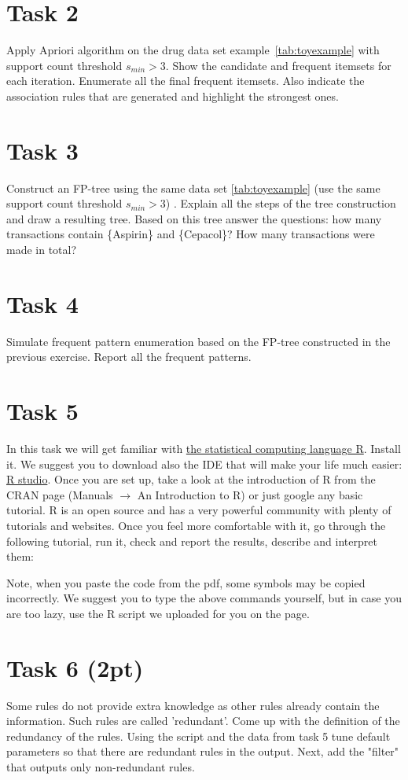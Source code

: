\documentclass{article}
\begin{document}
\section*{Task 2}
Apply Apriori algorithm on the drug data set example~\ref{tab:toyexample} with support count threshold $s_{min} > 3$. Show the candidate and frequent itemsets for each iteration. Enumerate all the final frequent itemsets. Also indicate the association rules that are generated and highlight the strongest ones.
\section*{Task 3}
Construct an FP-tree using the same data set \ref{tab:toyexample} (use the same support count  threshold $s_{min} > 3$) . Explain all the steps of the tree construction and draw a resulting tree. Based on this tree answer the questions: how many transactions contain \{Aspirin\} and \{Cepacol\}? How many transactions were made in total?


\section*{Task 4}
Simulate frequent pattern enumeration based on the FP-tree constructed in the previous exercise. Report all the frequent patterns.
 
\section*{Task 5}
In this task we will get familiar with \href{http://www.r-project.org/}{the statistical computing language R}. Install it. We suggest you to download also the IDE that will make your life much easier: \href{https://www.rstudio.com/}{R studio}. Once you are set up, take a look at the introduction of R from the CRAN page (Manuals $\rightarrow$ An Introduction to R) or just google any basic tutorial. R is an open source and has a very powerful community with plenty of tutorials and websites. Once you feel more comfortable with it, go through the following tutorial, run it, check and report the results, describe and interpret them:

Note, when you paste the code from the pdf, some symbols may be copied incorrectly. We suggest you to type the above commands yourself, but in case you are too lazy, use the R script we uploaded for you on the page.  

\section*{Task 6 (2pt)}
Some rules do not provide extra knowledge as other rules already  contain the information. Such rules are called 'redundant'. Come up with the definition of the redundancy of the rules. Using the script and the data from task 5 tune default parameters so that there are redundant rules in the output. Next, add the "filter" that outputs only non-redundant rules. 
\end{document}
